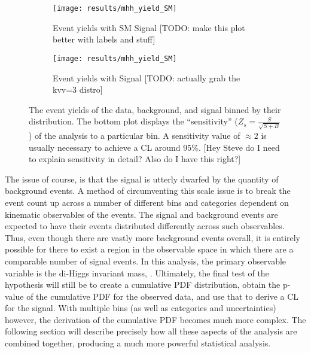     \begin{figure}
        \centering
        \begin{subfigure}{0.48\textwidth} 
            \texttt{[image: results/mhh\_yield\_SM]}
            \caption{Event yields with SM Signal [TODO: make this plot better with labels and stuff]}
            \label{fig:mhh_yield:kvv1}
        \end{subfigure}
        \begin{subfigure}{0.48\textwidth}
            \texttt{[image: results/mhh\_yield\_SM]}
            \caption{Event yields with Signal  [TODO: actually grab the kvv=3 distro]}
            \label{fig:mhh_yield:kvv3}
        \end{subfigure}
        \caption{
            The event yields of the data, background, and signal binned by their \mhh distribution.
            The bottom plot displays the ``sensitivity'' ($Z_s=\frac{S}{\sqrt{S+B}}$)
                of the analysis to a particular \mhh bin.
            A sensitivity value of $\approx 2$ is usually necessary to achieve a CL around 95\%.
            [Hey Steve do I need to explain sensitivity in detail? Also do I have this right?]
        }
    \end{figure}


    The issue of course, is that the signal is utterly dwarfed by the quantity of background events.
    A method of circumventing this scale issue
        is to break the event count up across a number of different
        bins and categories dependent on kinematic observables of the events.
    The signal and background events are expected to have their events distributed differently across such observables.
    Thus, even though there are vastly more background events overall,
        it is entirely possible for there to exist a region in the observable space
        in which there are a comparable number of signal events.
    In this analysis, the primary observable variable is the di-Higgs invariant mass, \mhh.
    Ultimately, the final test of the hypothesis will still be to create a cumulative PDF distribution,
        obtain the p-value of the cumulative PDF for the observed data, and use that to derive a CL for the signal.
    With multiple bins (as well as categories and uncertainties) however,
        the derivation of the cumulative PDF becomes much more complex.
    The following section will describe precisely how all these aspects of the analysis are combined together,
        producing a much more powerful statistical analysis.


